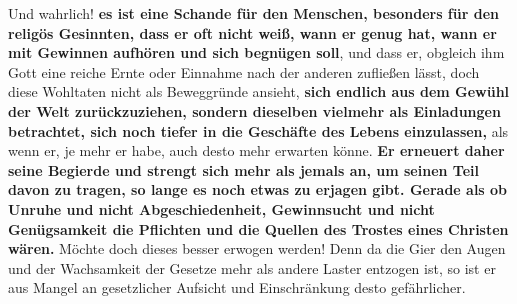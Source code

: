   Und wahrlich! \textbf{es ist eine
Schande für den Menschen, besonders für den
religös Gesinnten, dass er oft nicht weiß, wann er genug hat, wann er mit Gewinnen
aufhören und sich begnügen soll}, und dass er, obgleich ihm Gott eine reiche
Ernte
oder Einnahme nach der anderen zufließen lässt, doch diese Wohltaten nicht als
Beweggründe ansieht, \label{ref:13_07_reichtum_genuegsamkeit}
\textbf{sich endlich aus dem Gewühl der Welt zurückzuziehen,
sondern dieselben vielmehr als Einladungen betrachtet, sich noch tiefer in die
Geschäfte des Lebens einzulassen,} als wenn er, je mehr er habe, auch desto mehr
erwarten könne. \textbf{Er erneuert daher seine Begierde und strengt sich mehr
als
jemals an, um seinen Teil davon zu tragen, so lange es noch etwas zu erjagen
gibt. Gerade als ob Unruhe und nicht Abgeschiedenheit,
Gewinnsucht und nicht
Genügsamkeit die Pflichten und die Quellen des
Trostes eines Christen wären.}
Möchte doch dieses besser erwogen werden! Denn da die Gier den Augen und der
Wachsamkeit der Gesetze mehr als andere Laster entzogen ist, so ist er aus
 Mangel an gesetzlicher Aufsicht und
Einschränkung desto gefährlicher.

\medskip

